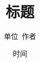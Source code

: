 \documentclass[UTF8]{ctexart}
\title{标题}
\author{单位\ 作者}
\date{时间}
\begin{document}
	\newcommand*\diff{\mathrm{d}}
	\newcommand*{\Rom}[1]{\uppercase\expandafter{\romannumeral#1}}
	\newcommand{\Emph}[1]{\textbf{#1}}
	\newcommand*{\secref}[1]{第\ref{#1}节}
	\newcommand*{\degC}{$\mathrm{\deg C}$}
	\renewcommand*\figureautorefname{图}
	\renewcommand*\tableautorefname{表}
	\renewcommand*{\equationautorefname}{方程}
	\maketitle



	\clearpage
	\printbibliography[heading=bibintoc,title=参考文献]
\end{document}
